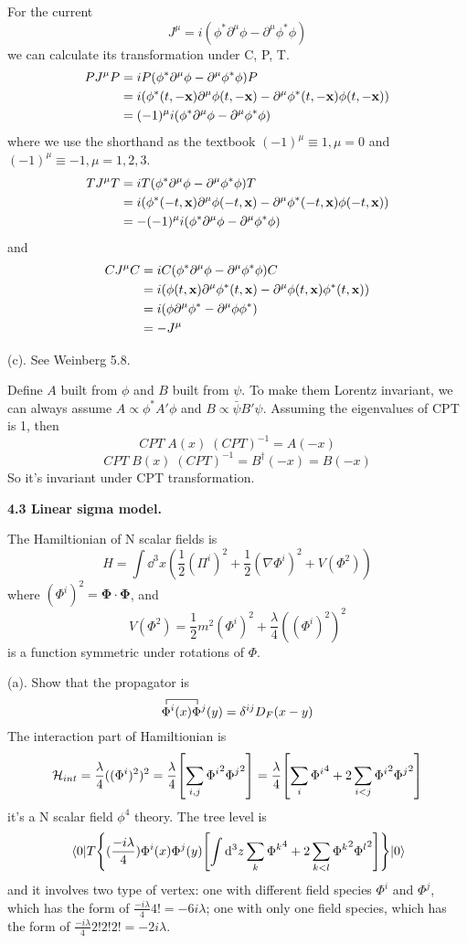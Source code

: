 \documentclass{article}
\newcommand{\bm}[1]{\boldsymbol{#1}}
\begin{document}
For the current
$$J^{\mu}=i(\phi^*\partial^{\mu}\phi-\partial^{\mu}\phi^*\phi)$$
we can calculate its transformation under C, P, T.
\begin{align*}
  PJ^{\mu}P&=iP(\phi^*\partial^{\mu}\phi-\partial^{\mu}\phi^*\phi)P\\
  &=i(\phi^*(t,-\vb{x})\partial^{\mu}\phi(t,-\vb{x})-\partial^{\mu}\phi^*(t,-\vb{x})\phi(t,-\vb{x}))\\
  &=(-1)^{\mu}i(\phi^*\partial^{\mu}\phi-\partial^{\mu}\phi^*\phi)
\end{align*}
where we use the shorthand as the textbook $(-1)^{\mu}\equiv1,\mu=0$ and $(-1)^{\mu}\equiv -1,\mu=1,2,3$.
\begin{align*}
  TJ^{\mu}T&=iT(\phi^*\partial^{\mu}\phi-\partial^{\mu}\phi^*\phi)T\\
  &=i(\phi^*(-t,\vb{x})\partial^{\mu}\phi(-t,\vb{x})-\partial^{\mu}\phi^*(-t,\vb{x})\phi(-t,\vb{x}))\\
  &=-(-1)^{\mu}i(\phi^*\partial^{\mu}\phi-\partial^{\mu}\phi^*\phi)
\end{align*}
and
\begin{align*}
  CJ^{\mu}C&=iC(\phi^*\partial^{\mu}\phi-\partial^{\mu}\phi^*\phi)C\\
  &=i(\phi(t,\vb{x})\partial^{\mu}\phi^*(t,\vb{x})-\partial^{\mu}\phi(t,\vb{x})\phi^*(t,\vb{x}))\\
  &=i(\phi\partial^{\mu}\phi^*-\partial^{\mu}\phi\phi^*)\\
  &=-J^{\mu}
\end{align*}

(c). See Weinberg 5.8.

Define $A$ built from $\phi$ and $B$ built from $\psi$. To make them Lorentz invariant, we can always assume $A\propto\phi^*A'\phi$ and $B\propto \bar\psi B'\psi$. Assuming the eigenvalues of CPT is 1, then
$$CPT\; A(x) \; (CPT)^{-1}=A(-x)$$
$$CPT\; B(x) \; (CPT)^{-1}=B^{\dagger}(-x)=B(-x)$$
So it's invariant under CPT transformation.


{\bf4.3\quad
Linear sigma model.}

The Hamiltionian of N scalar fields is
$$H=\int\dd^3x(\frac{1}{2}(\Pi^i)^2+\frac{1}{2}(\nabla\Phi^i)^2+V(\Phi^2))$$
where $(\Phi^i)^2=\bm{\Phi\cdot\Phi}$, and
$$V(\Phi^2)=\frac{1}{2}m^2(\Phi^i)^2+\frac{\lambda}{4}((\Phi^i)^2)^2$$
is a function symmetric under rotations of $\Phi$.

(a). Show that the propagator is
$$\contraction{}{\Phi}{^i(x)}{\Phi}\Phi^i(x)\Phi^j(y)=\delta^{ij}D_F(x-y)$$
The interaction part of Hamiltionian is
$$\mathcal{H}_{int}=\frac{\lambda}{4}((\Phi^i)^2)^2=\frac{\lambda}{4}\bqty{\sum_{i,j}{\Phi^i}^2{\Phi^j}^2}=\frac{\lambda}{4}\bqty{\sum_i{\Phi^i}^4+2\sum_{i<j}{\Phi^i}^2{\Phi^j}^2}$$
it's a N scalar field $\phi^4$ theory. The tree level is
$$\mel{0}{T\Bqty{(\frac{-i\lambda}{4})\Phi^i(x)\Phi^j(y)\bqty{\int\dd^3 z\sum_k{\Phi^k}^4+2\sum_{k<l}{\Phi^k}^2{\Phi^l}^2}}}{0}$$
and it involves two type of vertex: one with different field species $\Phi^i$ and $\Phi^j$, which has the form of $\frac{-i\lambda}{4}4!=-6i\lambda$; one with only one field species, which has the form of $\frac{-i\lambda}{4}2!2!2!=-2i\lambda$.
\end{document}
